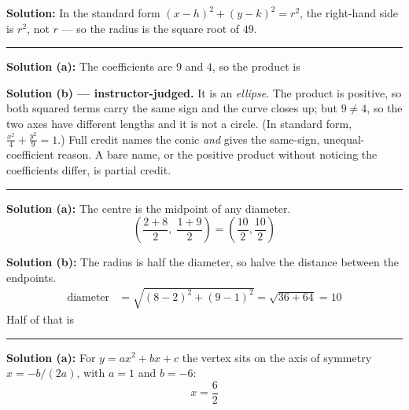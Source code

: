 \documentclass[12pt]{article}
\begin{document}




\textbf{Solution:} In the standard form $(x-h)^2 + (y-k)^2 = r^2$, the right-hand side is
$r^2$, not $r$ --- so the radius is the square root of $49$. 

\vspace{0.2cm}\noindent\rule{\linewidth}{0.2pt}


\textbf{Solution (a):} The coefficients are $9$ and $4$, so the product is 

\vspace{0.15cm}
\textbf{Solution (b) --- instructor-judged.} It is an \emph{ellipse}. The product is
positive, so both squared terms carry the same sign and the curve closes up; but $9 \ne 4$,
so the two axes have different lengths and it is not a circle. (In standard form,
$\frac{x^2}{4} + \frac{y^2}{9} = 1$.) Full credit names the conic \emph{and} gives the
same-sign, unequal-coefficient reason. A bare name, or the positive product without noticing
the coefficients differ, is partial credit.

\vspace{0.2cm}\noindent\rule{\linewidth}{0.2pt}


\textbf{Solution (a):} The centre is the midpoint of any diameter.
\[ \left( \frac{2 + 8}{2}, \; \frac{1 + 9}{2} \right) = \left( \frac{10}{2}, \frac{10}{2} \right) \]

\textbf{Solution (b):} The radius is half the diameter, so halve the distance between the
endpoints.
\begin{align*}
  \text{diameter} &= \sqrt{(8 - 2)^2 + (9 - 1)^2} = \sqrt{36 + 64} = 10
\end{align*}
Half of that is 

\vspace{0.2cm}\noindent\rule{\linewidth}{0.2pt}


\textbf{Solution (a):} For $y = ax^2 + bx + c$ the vertex sits on the axis of symmetry
$x = -b/(2a)$, with $a = 1$ and $b = -6$:
\[ x = \frac{6}{2} \]
\end{document}
